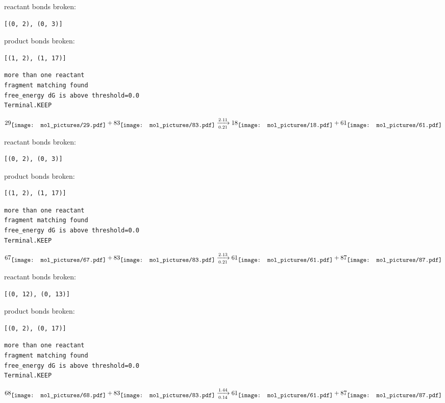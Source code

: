 \documentclass{article}
\begin{document}
reactant bonds broken:\begin{verbatim}
[(0, 2), (0, 3)]
\end{verbatim}
product bonds broken:\begin{verbatim}
[(1, 2), (1, 17)]
\end{verbatim}




\vspace{1cm}
\begin{verbatim}
more than one reactant
fragment matching found
free_energy dG is above threshold=0.0
Terminal.KEEP
\end{verbatim}
$$
29
\raisebox{-.5\height}{\texttt{[image: mol\_pictures/29.pdf]}}
+
83
\raisebox{-.5\height}{\texttt{[image: mol\_pictures/83.pdf]}}
\xrightarrow[0.21]{2.11}
18
\raisebox{-.5\height}{\texttt{[image: mol\_pictures/18.pdf]}}
+
61
\raisebox{-.5\height}{\texttt{[image: mol\_pictures/61.pdf]}}
$$


reactant bonds broken:\begin{verbatim}
[(0, 2), (0, 3)]
\end{verbatim}
product bonds broken:\begin{verbatim}
[(1, 2), (1, 17)]
\end{verbatim}




\vspace{1cm}
\begin{verbatim}
more than one reactant
fragment matching found
free_energy dG is above threshold=0.0
Terminal.KEEP
\end{verbatim}
$$
67
\raisebox{-.5\height}{\texttt{[image: mol\_pictures/67.pdf]}}
+
83
\raisebox{-.5\height}{\texttt{[image: mol\_pictures/83.pdf]}}
\xrightarrow[0.21]{2.13}
61
\raisebox{-.5\height}{\texttt{[image: mol\_pictures/61.pdf]}}
+
87
\raisebox{-.5\height}{\texttt{[image: mol\_pictures/87.pdf]}}
$$


reactant bonds broken:\begin{verbatim}
[(0, 12), (0, 13)]
\end{verbatim}
product bonds broken:\begin{verbatim}
[(0, 2), (0, 17)]
\end{verbatim}




\vspace{1cm}
\begin{verbatim}
more than one reactant
fragment matching found
free_energy dG is above threshold=0.0
Terminal.KEEP
\end{verbatim}
$$
68
\raisebox{-.5\height}{\texttt{[image: mol\_pictures/68.pdf]}}
+
83
\raisebox{-.5\height}{\texttt{[image: mol\_pictures/83.pdf]}}
\xrightarrow[0.14]{1.44}
61
\raisebox{-.5\height}{\texttt{[image: mol\_pictures/61.pdf]}}
+
87
\raisebox{-.5\height}{\texttt{[image: mol\_pictures/87.pdf]}}
$$
\end{document}
